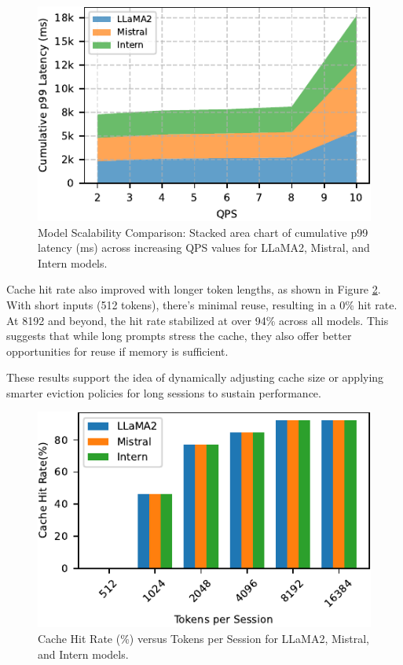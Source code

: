 \documentclass[sigconf,nonacm]{acmart}
\begin{document}
\begin{figure} [h]
    \centering
   \includegraphics[scale=0.8]{figure12_latency_vs_model_stacked.pdf}
   \vspace{-1.0em}  
    \caption{Model Scalability Comparison: Stacked area chart of cumulative p99 latency (ms) across increasing QPS values for LLaMA2, Mistral, and Intern models.}
    \vspace{-1.0em}  
    \label{fig12}
\end{figure}
\par Cache hit rate also improved with longer token lengths, as shown in Figure \ref{fig11}. With short inputs (512 tokens), there’s minimal reuse, resulting in a 0\% hit rate. At 8192 and beyond, the hit rate stabilized at over 94\% across all models. This suggests that while long prompts stress the cache, they also offer better opportunities for reuse if memory is sufficient.

These results support the idea of dynamically adjusting cache size or applying smarter eviction policies for long sessions to sustain performance.
\begin{figure}
    \centering
   \includegraphics[scale=0.8]{figure11_cache_hit_vs_tokens.pdf}
    \vspace{-1.0em}
    \caption{Cache Hit Rate (\%) versus Tokens per Session for LLaMA2, Mistral, and Intern models.}
    \label{fig11}
\end{figure}
\end{document}
